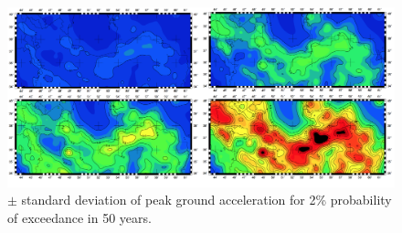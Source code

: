 \begin{figure} [!ht]
\centering
\includegraphics[scale=0.15]{figures/pdf/pga_2_minus_plus.pdf} 
\caption{$\pm$ standard deviation of peak ground acceleration for 2\% probability of exceedance in 50 years.}
\label{fig:pga_2_minus_plus}
\end{figure}



